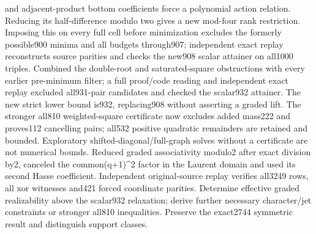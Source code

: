 and adjacent-product bottom coefficients force a polynomial action relation. Reducing its half-difference modulo two gives a new mod-four rank restriction. Imposing this on every full cell before minimization excludes the formerly possible900 minima and all budgets through907; independent exact replay reconstructs source parities and checks the new908 scalar attainer on all1000 triples. Combined the double-root and saturated-square obstructions with every earlier pre-minimum filter; a full proof/code reading and independent exact replay excluded all931-pair candidates and checked the scalar932 attainer. The new strict lower bound is932, replacing908 without asserting a graded lift. The stronger all810 weighted-square certificate now excludes added mass222 and proves112 cancelling pairs; all532 positive quadratic remainders are retained and bounded. Exploratory shifted-diagonal/full-graph solves without a certificate are not numerical bounds. Reduced graded associativity modulo2 after exact division by2, canceled the common(q+1)\textasciicircum{}2 factor in the Laurent domain and used its second Hasse coefficient. Independent original-source replay verifies all3249 rows, all xor witnesses and421 forced coordinate parities. Determine effective graded realizability above the scalar932 relaxation; derive further necessary character/jet constraints or stronger all810 inequalities. Preserve the exact2744 symmetric result and distinguish support classes.
